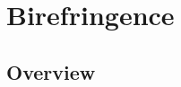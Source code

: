 \renewcommand{\lastmod}{September 18, 2023}
\renewcommand{\chapterauthors}{Markus Lippitz}

\chapter{Birefringence}

\section{Overview}




\printbibliography[segment=\therefsegment,heading=subbibliography]
